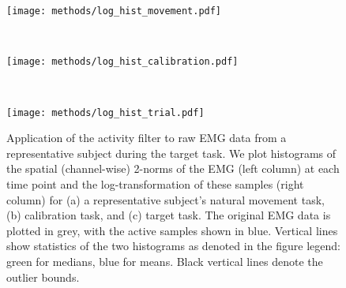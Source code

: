 \documentclass[../main.tex]{subfiles}
\begin{document}



\begin{figure}[!htb]
  \begin{minipage}[b]{0.8\linewidth}
    \centering
    \texttt{[image: methods/log\_hist\_movement.pdf]}
    \subcaption{}
    \vspace{4ex}
  \end{minipage}\\%
  \begin{minipage}[b]{0.8\linewidth}
    \centering
    \texttt{[image: methods/log\_hist\_calibration.pdf]}
    \subcaption{}
    \vspace{4ex}
  \end{minipage}\\%
  \begin{minipage}[b]{0.8\linewidth}
    \centering
    \texttt{[image: methods/log\_hist\_trial.pdf]}
    \subcaption{}
    \vspace{4ex}
  \end{minipage}
  \caption[Log transforming EMG]{Application of the activity filter to raw EMG data from a representative subject during the target task. We plot histograms of the spatial (channel-wise) 2-norms of the EMG (left column) at each time point and the log-transformation of these samples (right column) for (a) a representative subject's natural movement task, (b) calibration task, and (c) target task. The original EMG data is plotted in grey, with the active samples shown in blue. Vertical lines show statistics of the two histograms as denoted in the figure legend: green for medians, blue for means. Black vertical lines denote the outlier bounds.}\label{fig:log_hist}
\end{figure}
\end{document}
